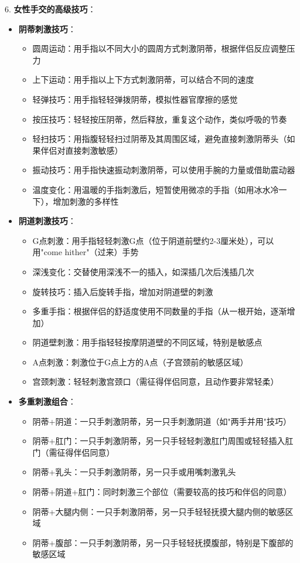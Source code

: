 \documentclass[12pt,UTF8]{ctexbook}
\begin{document}
6. \textbf{女性手交的高级技巧}：
\begin{itemize}
	\item \textbf{阴蒂刺激技巧}：
	\begin{itemize}
		\item 圆周运动：用手指以不同大小的圆周方式刺激阴蒂，根据伴侣反应调整压力
		\item 上下运动：用手指以上下方式刺激阴蒂，可以结合不同的速度
		\item 轻弹技巧：用手指轻轻弹拨阴蒂，模拟性器官摩擦的感觉
		\item 按压技巧：轻轻按压阴蒂，然后释放，重复这个动作，类似呼吸的节奏
		\item 轻扫技巧：用指腹轻轻扫过阴蒂及其周围区域，避免直接刺激阴蒂头（如果伴侣对直接刺激敏感）
		\item 振动技巧：用手指快速振动刺激阴蒂，可以使用手腕的力量或借助震动器
		\item 温度变化：用温暖的手指刺激后，短暂使用微凉的手指（如用冰水冷一下），增加刺激的多样性
	\end{itemize}
	\item \textbf{阴道刺激技巧}：
	\begin{itemize}
		\item G点刺激：用手指轻轻刺激G点（位于阴道前壁约2-3厘米处），可以用"come hither"（过来）手势
		\item 深浅变化：交替使用深浅不一的插入，如深插几次后浅插几次
		\item 旋转技巧：插入后旋转手指，增加对阴道壁的刺激
		\item 多重手指：根据伴侣的舒适度使用不同数量的手指（从一根开始，逐渐增加）
		\item 阴道壁刺激：用手指轻轻按摩阴道壁的不同区域，特别是敏感点
		\item A点刺激：刺激位于G点上方的A点（子宫颈前的敏感区域）
		\item 宫颈刺激：轻轻刺激宫颈口（需征得伴侣同意，且动作要非常轻柔）
	\end{itemize}
	\item \textbf{多重刺激组合}：
	\begin{itemize}
		\item 阴蒂+阴道：一只手刺激阴蒂，另一只手刺激阴道（如"两手并用"技巧）
		\item 阴蒂+肛门：一只手刺激阴蒂，另一只手轻轻刺激肛门周围或轻轻插入肛门（需征得伴侣同意）
		\item 阴蒂+乳头：一只手刺激阴蒂，另一只手或用嘴刺激乳头
		\item 阴蒂+阴道+肛门：同时刺激三个部位（需要较高的技巧和伴侣的同意）
		\item 阴蒂+大腿内侧：一只手刺激阴蒂，另一只手轻轻抚摸大腿内侧的敏感区域
		\item 阴蒂+腹部：一只手刺激阴蒂，另一只手轻轻抚摸腹部，特别是下腹部的敏感区域
	\end{itemize}
\end{itemize}
\end{document}

